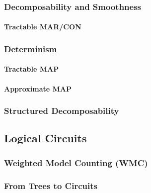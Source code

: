 			\subsubsection{Decomposability and Smoothness} %

				\paragraph{Tractable MAR/CON} %

			\subsubsection{Determinism} %

				\paragraph{Tractable MAP} %

				\paragraph{Approximate MAP} %

			\subsubsection{Structured Decomposability} %

		\subsection{Logical Circuits} %

			\subsubsection{Weighted Model Counting (WMC)} %

			\subsubsection{From Trees to Circuits} %

